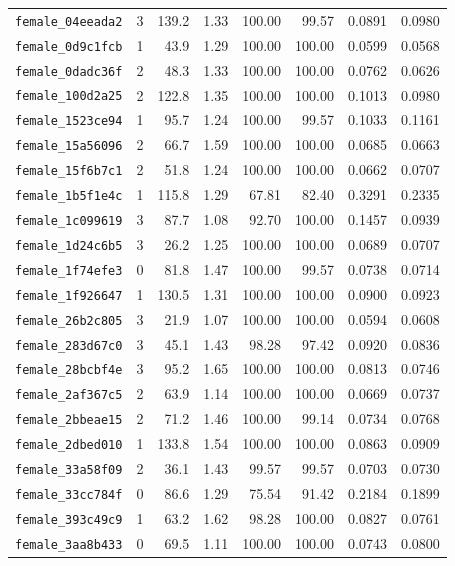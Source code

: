 \begin{longtable}{lrrrrrrr}
\texttt{female\_04eeada2} & 3 & 139.2 & 1.33 & 100.00 & 99.57 & 0.0891 & 0.0980 \\
\texttt{female\_0d9c1fcb} & 1 & 43.9 & 1.29 & 100.00 & 100.00 & 0.0599 & 0.0568 \\
\texttt{female\_0dadc36f} & 2 & 48.3 & 1.33 & 100.00 & 100.00 & 0.0762 & 0.0626 \\
\texttt{female\_100d2a25} & 2 & 122.8 & 1.35 & 100.00 & 100.00 & 0.1013 & 0.0980 \\
\texttt{female\_1523ce94} & 1 & 95.7 & 1.24 & 100.00 & 99.57 & 0.1033 & 0.1161 \\
\texttt{female\_15a56096} & 2 & 66.7 & 1.59 & 100.00 & 100.00 & 0.0685 & 0.0663 \\
\texttt{female\_15f6b7c1} & 2 & 51.8 & 1.24 & 100.00 & 100.00 & 0.0662 & 0.0707 \\
\texttt{female\_1b5f1e4c} & 1 & 115.8 & 1.29 & 67.81 & 82.40 & 0.3291 & 0.2335 \\
\texttt{female\_1c099619} & 3 & 87.7 & 1.08 & 92.70 & 100.00 & 0.1457 & 0.0939 \\
\texttt{female\_1d24c6b5} & 3 & 26.2 & 1.25 & 100.00 & 100.00 & 0.0689 & 0.0707 \\
\texttt{female\_1f74efe3} & 0 & 81.8 & 1.47 & 100.00 & 99.57 & 0.0738 & 0.0714 \\
\texttt{female\_1f926647} & 1 & 130.5 & 1.31 & 100.00 & 100.00 & 0.0900 & 0.0923 \\
\texttt{female\_26b2c805} & 3 & 21.9 & 1.07 & 100.00 & 100.00 & 0.0594 & 0.0608 \\
\texttt{female\_283d67c0} & 3 & 45.1 & 1.43 & 98.28 & 97.42 & 0.0920 & 0.0836 \\
\texttt{female\_28bcbf4e} & 3 & 95.2 & 1.65 & 100.00 & 100.00 & 0.0813 & 0.0746 \\
\texttt{female\_2af367c5} & 2 & 63.9 & 1.14 & 100.00 & 100.00 & 0.0669 & 0.0737 \\
\texttt{female\_2bbeae15} & 2 & 71.2 & 1.46 & 100.00 & 99.14 & 0.0734 & 0.0768 \\
\texttt{female\_2dbed010} & 1 & 133.8 & 1.54 & 100.00 & 100.00 & 0.0863 & 0.0909 \\
\texttt{female\_33a58f09} & 2 & 36.1 & 1.43 & 99.57 & 99.57 & 0.0703 & 0.0730 \\
\texttt{female\_33cc784f} & 0 & 86.6 & 1.29 & 75.54 & 91.42 & 0.2184 & 0.1899 \\
\texttt{female\_393c49c9} & 1 & 63.2 & 1.62 & 98.28 & 100.00 & 0.0827 & 0.0761 \\
\texttt{female\_3aa8b433} & 0 & 69.5 & 1.11 & 100.00 & 100.00 & 0.0743 & 0.0800 \\

\end{longtable}
